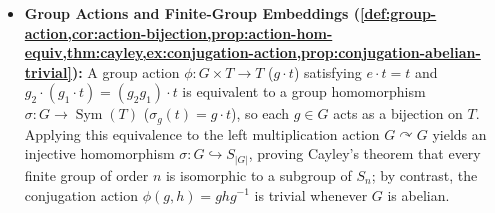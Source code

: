 \begin{overview}
\begin{itemize}
    \item \textbf{Group Actions and Finite-Group Embeddings (\cref{def:group-action,cor:action-bijection,prop:action-hom-equiv,thm:cayley,ex:conjugation-action,prop:conjugation-abelian-trivial}):} A group action $\phi \colon G \times T \to T$ ($g \cdot t$) satisfying $e \cdot t = t$ and $g_2 \cdot (g_1 \cdot t) = (g_2 g_1) \cdot t$ is equivalent to a group homomorphism $\sigma \colon G \to \operatorname{Sym}(T)$ ($\sigma_g(t) = g \cdot t$), so each $g \in G$ acts as a bijection on $T$. Applying this equivalence to the left multiplication action $G \curvearrowright G$ yields an injective homomorphism $\sigma \colon G \hookrightarrow S_{|G|}$, proving Cayley's theorem that every finite group of order $n$ is isomorphic to a subgroup of $S_n$; by contrast, the conjugation action $\phi(g,h) = ghg^{-1}$ is trivial whenever $G$ is abelian.
\end{itemize}
\end{overview}